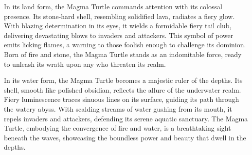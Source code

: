 \documentclass[letterpaper,openany,twoside,twocolumn]{book}
\begin{document}
In its land form, the Magma Turtle commands attention with its colossal presence. Its stone-hard shell, resembling solidified lava, radiates a fiery glow. With blazing determination in its eyes, it wields a formidable fiery tail club, delivering devastating blows to invaders and attackers. This symbol of power emits licking flames, a warning to those foolish enough to challenge its dominion. Born of fire and stone, the Magma Turtle stands as an indomitable force, ready to unleash its wrath upon any who threaten its realm.

In its water form, the Magma Turtle becomes a majestic ruler of the depths. Its shell, smooth like polished obsidian, reflects the allure of the underwater realm. Fiery luminescence traces sinuous lines on its surface, guiding its path through the watery abyss. With scalding streams of water gushing from its mouth, it repels invaders and attackers, defending its serene aquatic sanctuary. The Magma Turtle, embodying the convergence of fire and water, is a breathtaking sight beneath the waves, showcasing the boundless power and beauty that dwell in the depths.

\vfill\eject %
\end{document}
